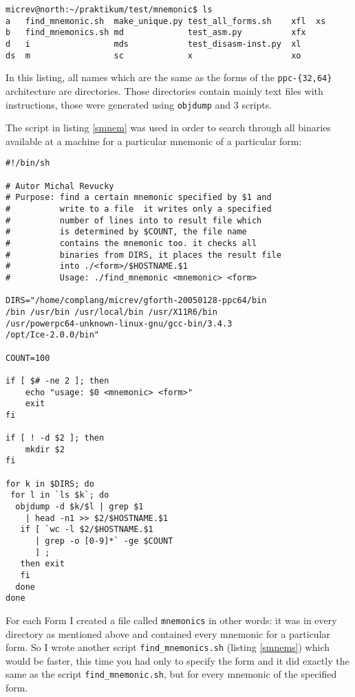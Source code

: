 \begin{verbatim}
micrev@north:~/praktikum/test/mnemonic$ ls
a   find_mnemonic.sh  make_unique.py test_all_forms.sh    xfl  xs     
b   find_mnemonics.sh md             test_asm.py          xfx 
d   i                 mds            test_disasm-inst.py  xl
ds  m                 sc             x                    xo
\end{verbatim}

In this listing, all names which are the same as the forms of the
\texttt{ppc-\{32,64\}} architecture are directories.
Those directories contain mainly text files with instructions, those
were generated using \texttt{objdump} and 3 scripts.

The script in listing \ref{smnem} was used in order to search through all
binaries available at a machine for a particular mnemonic of a particular form:

\begin{lstlisting}[float, caption=Script: find\_mnemonic.sh, label=smnem]
#!/bin/sh

# Autor Michal Revucky 
# Purpose: find a certain mnemonic specified by $1 and 
#          write to a file  it writes only a specified 
#          number of lines into to result file which 
#          is determined by $COUNT, the file name 
#          contains the mnemonic too. it checks all 
#          binaries from DIRS, it places the result file 
#          into ./<form>/$HOSTNAME.$1
#          Usage: ./find_mnemonic <mnemonic> <form>

DIRS="/home/complang/micrev/gforth-20050128-ppc64/bin 
/bin /usr/bin /usr/local/bin /usr/X11R6/bin 
/usr/powerpc64-unknown-linux-gnu/gcc-bin/3.4.3 
/opt/Ice-2.0.0/bin"

COUNT=100

if [ $# -ne 2 ]; then 
    echo "usage: $0 <mnemonic> <form>"
    exit
fi

if [ ! -d $2 ]; then 
    mkdir $2
fi

for k in $DIRS; do
 for l in `ls $k`; do
  objdump -d $k/$l | grep $1 
    | head -n1 >> $2/$HOSTNAME.$1
   if [ `wc -l $2/$HOSTNAME.$1 
      | grep -o [0-9]*` -ge $COUNT 
      ] ; 
   then exit
   fi
  done
done
\end{lstlisting}

For each Form I created a file called \texttt{mnemonics} in other words: it was 
in every directory as mentioned above and contained every mnemonic for a 
particular form. So I wrote another script \texttt{find\_mnemonics.sh} 
(listing \ref{smnems}) which would be faster, this time you had only to 
specify the form and it did exactly the same as the script 
\texttt{find\_mnemonic.sh}, but for every mnemonic of the specified form.

